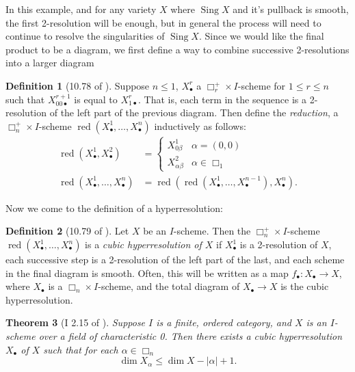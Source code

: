 \documentclass{report}
\newtheorem{theorem}{Theorem}[section]
\theoremstyle{definition}
\newtheorem{definition}[theorem]{Definition}
\DeclareMathOperator{\Sing}{Sing}
\DeclareMathOperator{\red}{red}
\begin{document}
In this example, and for any variety $X$ where $\Sing X$ and it's pullback is smooth, the first 2-resolution will be enough, but in general the process will need to continue to resolve the singularities of $\Sing X$.
Since we would like the final product to be a diagram, we first define a way to combine successive 2-resolutions into a larger diagram

\begin{definition}[10.78 of \cite{Kollar2013}]
	Suppose $n \leq 1$, $X^r_\bullet$ a $\Box^+_r \times I$-scheme for $1 \leq r \leq n$ such that $X_{00\bullet}^{r+1}$ is equal to $X_{1\bullet}^r$.
	That is, each term in the sequence is a 2-resolution of the left part of the previous diagram.
	Then define the {\it reduction}, a $\Box_n^+ \times I$-scheme $\red(X_\bullet^1, \dots, X_\bullet^n)$ inductively as follows:
	\begin{align*}
		\red(X_\bullet^1, X_\bullet^2) &= 
		\begin{cases}
			X^1_{0\beta} & \alpha = (0,0) \\
			X^2_{\alpha\beta} & \alpha \in \Box_1
		\end{cases} \\
		\red(X_\bullet^1, \dots, X_\bullet^n) &= \red(\red(X_\bullet^1, \dots, X_\bullet^{n-1}), X^n_\bullet).
	\end{align*}
\end{definition}

Now we come to the definition of a hyperresolution:

\begin{definition}[10.79 of \cite{Kollar2013}]
	Let $X$ be an $I$-scheme.
	Then the $\Box_n^+ \times I$-scheme $\red(X_\bullet^1, \dots, X_\bullet^n)$ is a {\it cubic hyperresolution of $X$} if $X_\bullet^1$ is a 2-resolution of $X$, each successive step is a 2-resolution of the left part of the last, and each scheme in the final diagram is smooth.
	Often, this will be written as a map $f_\bullet : X_\bullet \rightarrow X$, where $X_\bullet$ is a $\Box_n \times I$-scheme, and the total diagram of $X_\bullet \rightarrow X$ is the cubic hyperresolution.
\end{definition}

\begin{theorem}[I 2.15 of \cite{Guillen1988}]
	\label{thm:hyperexist}
	Suppose $I$ is a finite, ordered category, and $X$ is an $I$-scheme over a field of characteristic 0.
	Then there exists a cubic hyperresolution $X_\bullet$ of $X$ such that for each $\alpha \in \Box_n$
	\[
	\dim X_\alpha \leq \dim X - |\alpha| + 1.
	\]
\end{theorem}
\end{document}
